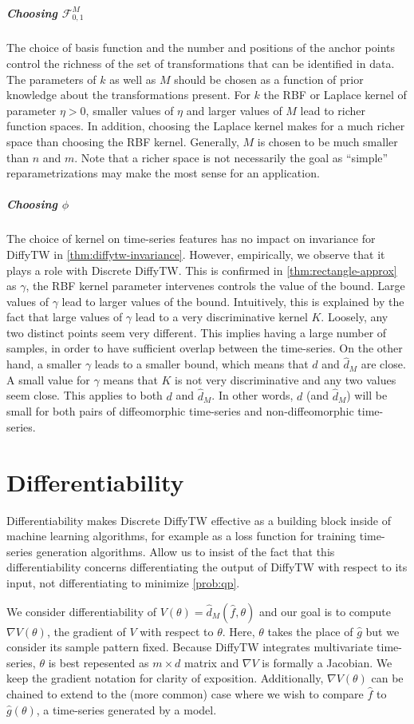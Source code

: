 \subparagraph{Choosing $\mathcal F_{0,1}^M$} The choice of basis function and the number and positions of the anchor points control the richness of the set of transformations that can be identified in data. The parameters of $k$ as well as $M$ should be chosen as a function of prior knowledge about the transformations present. For $k$ the RBF or Laplace kernel of parameter $\eta>0$, smaller values of $\eta$ and larger values of $M$ lead to richer function spaces. In addition, choosing the Laplace kernel makes for a much richer space than choosing the RBF kernel\cite{shawe-taylor}. Generally, $M$ is chosen to be much smaller than $n$ and $m$. Note that a richer space is not necessarily the goal as ``simple'' reparametrizations may make the most sense for an application.

\subparagraph{Choosing $\phi$} The choice of kernel on time-series features has no impact on invariance for DiffyTW in \cref{thm:diffytw-invariance}. However, empirically, we observe that it plays a role with Discrete DiffyTW. This is confirmed in \cref{thm:rectangle-approx} as $\gamma$, the RBF kernel parameter intervenes controls the value of the bound. Large values of $\gamma$ lead to larger values of the bound. Intuitively, this is explained by the fact that large values of $\gamma$ lead to a very discriminative kernel $K$. Loosely, any two distinct points seem very different. This implies having a large number of samples, in order to have sufficient overlap between the time-series. On the other hand, a smaller $\gamma$ leads to a smaller bound, which means that $d$ and $\hat d_M$ are close. A small value for $\gamma$ means that $K$ is not very discriminative and any two values seem close. This applies to both $d$ and $\hat d_M$. In other words, $d$ (and $\hat d_M$) will be small for both pairs of diffeomorphic time-series and non-diffeomorphic time-series.

\section{Differentiability}
Differentiability makes Discrete DiffyTW effective as a building block inside of machine learning algorithms, for example as a loss function for training time-series generation algorithms. Allow us to insist of the fact that this differentiability concerns differentiating the output of DiffyTW with respect to its input, not differentiating to minimize \cref{prob:qp}.

We consider differentiability of $V(\theta) = \hat d_M(\hat f, \theta)$ and our goal is to compute $\nabla V(\theta)$, the gradient of $V$ with respect to $\theta$. Here, $\theta$ takes the place of $\hat g$ but we consider its sample pattern fixed. Because DiffyTW integrates multivariate time-series, $\theta$ is best repesented as $m \times d$ matrix and $\nabla V$ is formally a Jacobian. We keep the gradient notation for clarity of exposition. Additionally, $\nabla V(\theta)$ can be chained to extend to the (more common) case where we wish to compare $\hat f$ to $\hat g(\theta)$, a time-series generated by a model.

